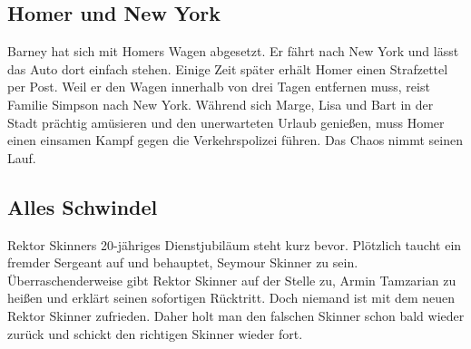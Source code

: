 \subsection{Homer und New York}\label{4F22}
Barney hat sich mit Homers Wagen abgesetzt. Er fährt nach New York und lässt das Auto dort einfach stehen. Einige Zeit später erhält Homer einen Strafzettel per Post. Weil er den Wagen innerhalb von drei Tagen entfernen muss, reist Familie Simpson nach New York. Während sich Marge, Lisa und Bart in der Stadt prächtig amüsieren und den unerwarteten Urlaub genießen, muss Homer einen einsamen Kampf gegen die Verkehrspolizei führen. Das Chaos nimmt seinen Lauf.

	
\subsection{Alles Schwindel}\label{4F23}
Rektor Skinners 20-jähriges Dienstjubiläum steht kurz bevor. Plötzlich taucht ein fremder Sergeant auf und behauptet, Seymour Skinner zu sein. Über\-ra\-schen\-der\-wei\-se gibt Rektor Skinner auf der Stelle zu, Armin Tamzarian zu heißen und erklärt seinen sofortigen Rücktritt. Doch niemand ist mit dem neuen Rektor Skinner zufrieden. Daher holt man den falschen Skinner schon bald wieder zurück und schickt den richtigen Skinner wieder fort.

